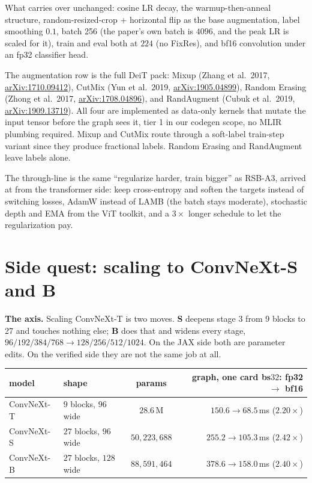 \noindent What carries over unchanged: cosine LR decay, the
warmup-then-anneal structure, random-resized-crop + horizontal flip
as the base augmentation, label smoothing $0.1$, batch 256 (the paper's
own batch is $4096$, and the peak LR is scaled for it), train and eval
both at $224$ (no FixRes), and bf16 convolution under an fp32 classifier
head.

The augmentation row is the full DeiT pack: Mixup (Zhang et al.\ 2017,
\href{https://arxiv.org/abs/1710.09412}{arXiv:1710.09412}), CutMix
(Yun et al.\ 2019, \href{https://arxiv.org/abs/1905.04899}{arXiv:1905.04899}),
Random Erasing (Zhong et al.\ 2017,
\href{https://arxiv.org/abs/1708.04896}{arXiv:1708.04896}), and
RandAugment (Cubuk et al.\ 2019,
\href{https://arxiv.org/abs/1909.13719}{arXiv:1909.13719}). All four
are implemented as data-only kernels that mutate the input tensor
before the graph sees it, tier 1 in our codegen scope, no MLIR
plumbing required. Mixup and CutMix route through a soft-label
train-step variant since they produce fractional labels. Random
Erasing and RandAugment leave labels alone.

The through-line is the same ``regularize harder, train bigger''
as RSB-A3, arrived at from the transformer side: keep cross-entropy
and soften the targets instead of switching losses, AdamW instead of
LAMB (the batch stays moderate), stochastic depth and EMA from the
ViT toolkit, and a $3\times$ longer schedule to let the
regularization pay.

\section{Side quest: scaling to ConvNeXt-S and B}
\label{sec:convnext_sb}

\textbf{The axis.} Scaling ConvNeXt-T is two moves. \textbf{S} deepens stage 3
from 9 blocks to 27 and touches nothing else; \textbf{B} does that and
widens every stage, $96/192/384/768 \to 128/256/512/1024$. On the JAX side both
are parameter edits. On the verified side they are not the same job at all.

\begin{center}
\begin{tabular}{@{}l l c r@{}}
\hline
model & shape & params & graph, one card bs$32$: fp32 $\to$ bf16 \\
\hline
ConvNeXt-T & $9$ blocks, $96$ wide  & $28.6$\,M        & $150.6 \to 68.5$\,ms \;($2.20\times$) \\
ConvNeXt-S & $27$ blocks, $96$ wide & $50{,}223{,}688$ & $255.2 \to 105.3$\,ms \;($\mathbf{2.42\times}$) \\
ConvNeXt-B & $27$ blocks, $128$ wide& $88{,}591{,}464$ & $378.6 \to 158.0$\,ms \;($2.40\times$) \\
\hline
\end{tabular}
\end{center}

